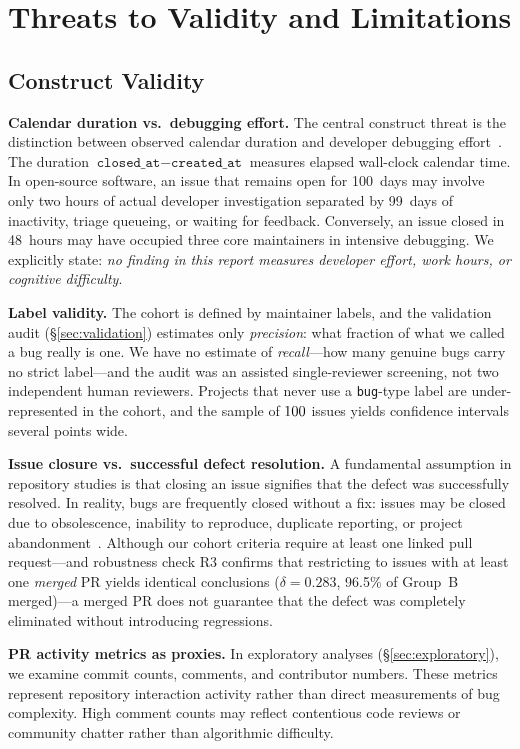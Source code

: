 \section{Threats to Validity and Limitations}\label{sec:threats}

\subsection{Construct Validity}\label{sec:threats_construct}
\textbf{Calendar duration vs.\ debugging effort.} The central construct threat is the distinction between observed calendar duration and developer debugging effort~\cite{mockus2002two}. The duration $\texttt{closed\_at} - \texttt{created\_at}$ measures elapsed wall-clock calendar time. In open-source software, an issue that remains open for 100~days may involve only two hours of actual developer investigation separated by 99~days of inactivity, triage queueing, or waiting for feedback. Conversely, an issue closed in 48~hours may have occupied three core maintainers in intensive debugging. We explicitly state: \emph{no finding in this report measures developer effort, work hours, or cognitive difficulty}.

\textbf{Label validity.} The cohort is defined by maintainer labels, and the validation audit (\S\ref{sec:validation}) estimates only \emph{precision}: what fraction of what we called a bug really is one. We have no estimate of \emph{recall}---how many genuine bugs carry no strict label---and the audit was an assisted single-reviewer screening, not two independent human reviewers. Projects that never use a \texttt{bug}-type label are under-represented in the cohort, and the sample of $100$ issues yields confidence intervals several points wide.

\textbf{Issue closure vs.\ successful defect resolution.} A fundamental assumption in repository studies is that closing an issue signifies that the defect was successfully resolved. In reality, bugs are frequently closed without a fix: issues may be closed due to obsolescence, inability to reproduce, duplicate reporting, or project abandonment~\cite{herzig2013not}. Although our cohort criteria require at least one linked pull request—and robustness check R3 confirms that restricting to issues with at least one \emph{merged} PR yields identical conclusions ($\delta = 0.283$, 96.5\% of Group~B merged)—a merged PR does not guarantee that the defect was completely eliminated without introducing regressions.

\textbf{PR activity metrics as proxies.} In exploratory analyses (\S\ref{sec:exploratory}), we examine commit counts, comments, and contributor numbers. These metrics represent repository interaction activity rather than direct measurements of bug complexity. High comment counts may reflect contentious code reviews or community chatter rather than algorithmic difficulty.

